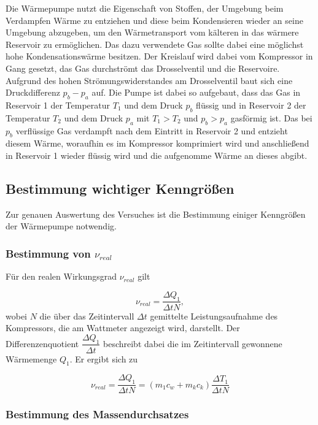 Die Wärmepumpe nutzt die Eigenschaft von Stoffen, der Umgebung beim Verdampfen Wärme zu entziehen und diese beim Kondensieren wieder an seine Umgebung abzugeben, um den Wärmetransport vom kälteren in das wärmere Reservoir
zu ermöglichen. Das dazu verwendete Gas sollte dabei eine möglichst hohe Kondensationswärme besitzen. Der Kreislauf wird dabei vom Kompressor in Gang gesetzt, das Gas durchströmt das Drosselventil und die Reservoire.
Aufgrund des hohen Strömungswiderstandes am Drosselventil baut sich eine Druckdifferenz $p_b-p_a$ auf.
Die Pumpe ist dabei so aufgebaut, dass das Gas in Reservoir 1 der Temperatur $T_1$ und dem Druck $p_b$ flüssig und in Reservoir 2 der Temperatur $T_2$ und dem Druck $p_a$ mit $T_1 > T_2$ und $p_b > p_a$ gasförmig ist.
Das bei $p_b$ verflüssige Gas verdampft nach dem Eintritt in Reservoir 2 und entzieht diesem Wärme, woraufhin es im Kompressor komprimiert wird und anschließend in Reservoir 1 wieder flüssig wird und die aufgenomme Wärme
an dieses abgibt.

\subsection{Bestimmung wichtiger Kenngrößen}

Zur genauen Auswertung des Versuches ist die Bestimmung einiger Kenngrößen der Wärmepumpe notwendig.

\subsubsection{Bestimmung von $ν_{real}$}

Für den realen Wirkungsgrad $ν_{real}$ gilt

\begin{equation}
    ν_{real} = \dfrac{ΔQ_1}{ΔtN},
\end{equation}
wobei $N$ die über das Zeitintervall $Δt$ gemittelte Leistungsaufnahme des Kompressors, die am Wattmeter angezeigt wird, darstellt. 
Der Differenzenquotient $\dfrac{ΔQ_1}{Δt}$ beschreibt dabei die im Zeitintervall gewonnene Wärmemenge $Q_1$. Er ergibt sich zu

\begin{equation}
    ν_{real} = \dfrac{ΔQ_1}{ΔtN} = (m_1c_w + m_kc_k)\dfrac{ΔT_1}{ΔtN}
    \label{eq:effrealdiffquo}
\end{equation}

\subsubsection{Bestimmung des Massendurchsatzes}


